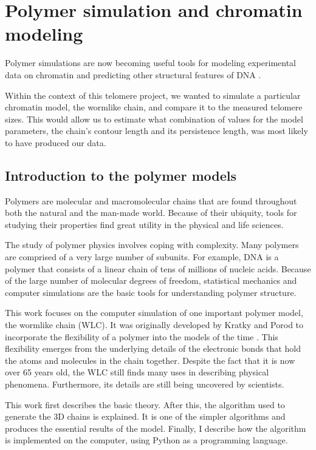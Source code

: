 \documentclass[11pt]{article}
\begin{document}
\section{Polymer simulation and chromatin modeling}
\label{sec-3}
Polymer simulations are now becoming useful tools for modeling
experimental data on chromatin and predicting other structural
features of DNA \cite{rivetti-jmolbiol-1996, giorgetti-cell-2014}.

Within the context of this telomere project, we wanted to simulate a
particular chromatin model, the wormlike chain, and compare it to the
measured telomere sizes. This would allow us to estimate what
combination of values for the model parameters, the chain's contour
length and its persistence length, was most likely to have produced
our data.

\subsection{Introduction to the polymer models}
\label{sec-3-1}
Polymers are molecular and macromolecular chains that are found
throughout both the natural and the man-made world. Because of their
ubiquity, tools for studying their properties find great utility in
the physical and life sciences.

The study of polymer physics involves coping with complexity. Many
polymers are comprised of a very large number of subunits. For
example, DNA is a polymer that consists of a linear chain of tens of
millions of nucleic acids. Because of the large number of molecular
degrees of freedom, statistical mechanics and computer simulations are
the basic tools for understanding polymer structure.

This work focuses on the computer simulation of one important polymer
model, the wormlike chain (WLC). It was originally developed by Kratky
and Porod to incorporate the flexibility of a polymer into the models
of the time \cite{kratkyporod-1949}. This flexibility emerges from the
underlying details of the electronic bonds that hold the atoms and
molecules in the chain together. Despite the fact that it is now over
65 years old, the WLC still finds many uses in describing physical
phenomena. Furthermore, its details are still being uncovered by
scientists.

This work first describes the basic theory. After this, the algorithm
used to generate the 3D chains is explained. It is one of the simpler
algorithms and produces the essential results of the model. Finally, I
describe how the algorithm is implemented on the computer, using
Python as a programming language.
\end{document}
